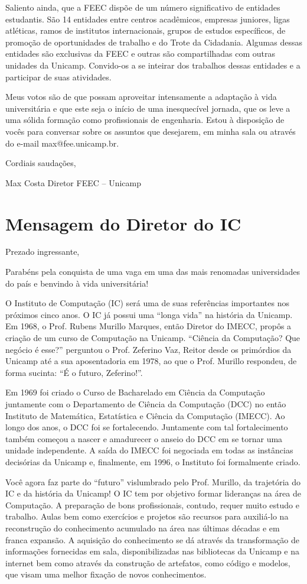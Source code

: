 Saliento ainda, que a FEEC dispõe de um número significativo de entidades
estudantis. São 14 entidades entre centros acadêmicos, empresas juniores, ligas
atléticas, ramos de institutos internacionais, grupos de estudos específicos, de
promoção de oportunidades de trabalho e do Trote da Cidadania. Algumas dessas
entidades são exclusivas da FEEC e outras são compartilhadas com outras unidades
da Unicamp. Convido-os a se inteirar dos trabalhos dessas entidades
e a participar de suas atividades.

Meus votos são de que possam aproveitar intensamente a adaptação à vida
universitária e que este seja o início de uma inesquecível jornada, que os leve
a uma sólida formação como profissionais de engenharia. Estou à disposição de
vocês para conversar sobre os assuntos que desejarem, em minha sala ou através
do e-mail max@fee.unicamp.br.

Cordiais saudações,

Max Costa Diretor
FEEC -- Unicamp

\section{Mensagem do Diretor do IC}
Prezado ingressante,

Parabéns pela conquista de uma vaga em uma das mais renomadas universidades do
país e benvindo à vida universitária!

O Instituto de Computação (IC) será uma de suas referências importantes nos
próximos cinco anos. O IC já possui uma “longa vida” na história da Unicamp. Em
1968, o Prof. Rubens Murillo Marques, então Diretor do IMECC, propôs a criação
de um curso de Computação na Unicamp. “Ciência da Computação? Que negócio
é esse?” perguntou o Prof. Zeferino Vaz, Reitor desde os primórdios da Unicamp
até a sua aposentadoria em 1978, ao que o Prof. Murillo respondeu, de forma
sucinta: “É o futuro, Zeferino!”.

Em 1969 foi criado o Curso de Bacharelado em Ciência da Computação juntamente
com o Departamento de Ciência da Computação (DCC) no então Instituto de
Matemática, Estatística e Ciência da Computação (IMECC). Ao longo dos anos,
o DCC foi se fortalecendo. Juntamente com tal fortalecimento também começou
a nascer e amadurecer o anseio do DCC em se tornar uma unidade independente.
A saída do IMECC foi negociada em todas as instâncias decisórias da Unicamp e,
finalmente, em 1996, o Instituto foi formalmente criado.

Você agora faz parte do “futuro” vislumbrado pelo Prof. Murillo, da trajetória
do IC e da história da Unicamp! O IC tem por objetivo formar lideranças na área
de Computação. A preparação de bons profissionais, contudo, requer muito estudo
e trabalho. Aulas bem como exercícios e projetos são recursos para auxiliá-lo na
reconstrução do conhecimento acumulado na área nas últimas décadas e em franca
expansão. A aquisição do conhecimento se dá através da transformação de
informações fornecidas em sala, disponibilizadas nas bibliotecas da Unicamp e na
internet bem como através da construção de artefatos, como código e modelos, que
visam uma melhor fixação de novos conhecimentos.

